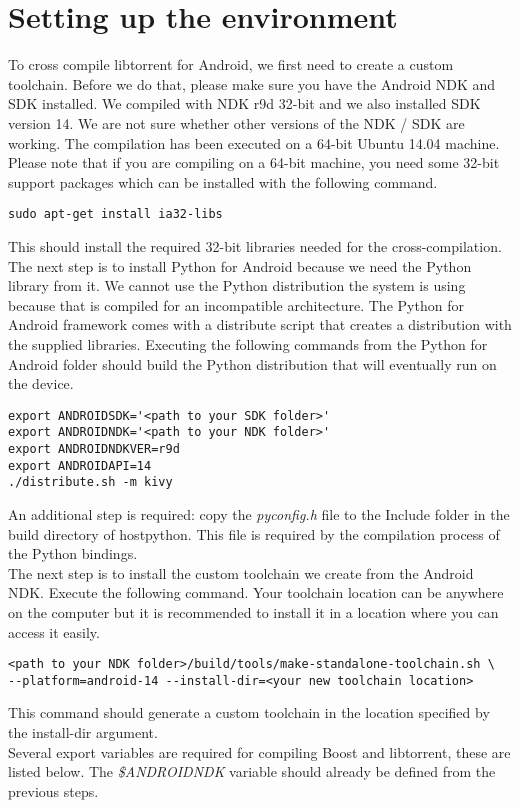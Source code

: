 \section{Setting up the environment}
	To cross compile libtorrent for Android, we first need to create a custom toolchain. Before we do that, please make sure you have the Android NDK and SDK installed. We compiled with NDK r9d 32-bit and we also installed SDK version 14. We are not sure whether other versions of the NDK / SDK are working. The compilation has been executed on a 64-bit Ubuntu 14.04 machine. Please note that if you are compiling on a 64-bit machine, you need some 32-bit support packages which can be installed with the following command.
	\begin{lstlisting}
sudo apt-get install ia32-libs
	\end{lstlisting}
	This should install the required 32-bit libraries needed for the cross-compilation. The next step is to install Python for Android because we need the Python library from it. We cannot use the Python distribution the system is using because that is compiled for an incompatible architecture. The Python for Android framework comes with a distribute script that creates a distribution with the supplied libraries. Executing the following commands from the Python for Android folder should build the Python distribution that will eventually run on the device.
	\begin{lstlisting}
export ANDROIDSDK='<path to your SDK folder>'
export ANDROIDNDK='<path to your NDK folder>'
export ANDROIDNDKVER=r9d
export ANDROIDAPI=14
./distribute.sh -m kivy
	\end{lstlisting}
	An additional step is required: copy the \emph{pyconfig.h} file to the Include folder in the build directory of hostpython. This file is required by the compilation process of the Python bindings.\\
	The next step is to install the custom toolchain we create from the Android NDK. Execute the following command. Your toolchain location can be anywhere on the computer but it is recommended to install it in a location where you can access it easily.
	\begin{lstlisting}
<path to your NDK folder>/build/tools/make-standalone-toolchain.sh \
--platform=android-14 --install-dir=<your new toolchain location>
	\end{lstlisting}
	This command should generate a custom toolchain in the location specified by the install-dir argument.\\
	Several export variables are required for compiling Boost and libtorrent, these are listed below. The \emph{\$ANDROIDNDK} variable should already be defined from the previous steps.
